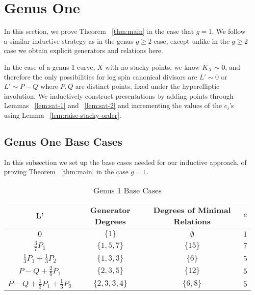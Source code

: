 \documentclass{amsart}
\theoremstyle{plain}
\theoremstyle{definition}
\theoremstyle{remark}
\numberwithin{equation}{section}
\newcommand\ssec{\subsection}
\newcommand{\halfcan}{L}
\begin{document}

\section{Genus One}
\label{sec:g-1}

In this section, we prove Theorem ~\ref{thm:main} in the case that $g = 1$.  We follow a similar inductive strategy as in the genus $g\geq 2$ case, except unlike in the $g \geq 2$ case we obtain explicit generators and relations here.

In the case of a genus 1 curve, $X$ with no stacky points, we know $K_X \sim 0$, and therefore the only possibilities for log spin canonical divisors are $\halfcan' \sim 0$ or $\halfcan' \sim P - Q$ where $P, Q$ are distinct points, fixed  under the hyperelliptic involution. We inductively construct presentations by adding points through Lemmas ~\ref{lem:sat-1} and ~\ref{lem:sat-2} and incrementing the values of the $e_i$'s using Lemma ~\ref{lem:raise-stacky-order}.

\ssec{Genus One Base Cases}
\label{ssec:g-1_base}
In this subsection we set up the base cases needed for our inductive approach, of proving Theorem ~\ref{thm:main} in the case $g = 1$.

\begin{table}	
\begin{tabular}
{| c || c | c | c |}	
	\hline
	L' & Generator Degrees & Degrees of Minimal Relations & $e$ \\
	\hline
	\hline
	$0$ & $\{1\}$ & $\emptyset$ & $1$ \\	\hline

	$\frac{3}{7} P_1$ & $\{1,5,7\}$ & $\{15\}$ & $7$ \\	\hline
	
	$\frac{1}{3} P_1 + \frac{1}{3} P_2$ & $\{1, 3, 3\}$ & $\{6\}$ & $5$ \\	\hline
	
	$P - Q + \frac{2}{5} P_1$ & $\{2, 3, 5\}$ & $\{12\}$ & $5$ \\	\hline
	
	$P - Q + \frac{1}{3} P_1 + \frac{1}{3}P_2$ & $\{2, 3, 3, 4\}$ & $\{6,8\}$ & $5$ \\	\hline
\end{tabular}	
	\caption{Genus 1 Base Cases}
	\label{table:g-1-base}
	
\end{table}
\end{document}
